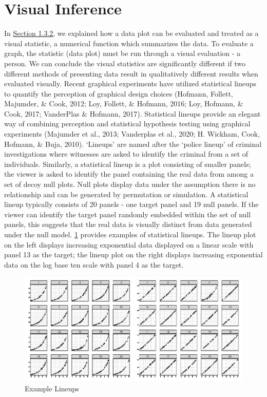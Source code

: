 \documentclass[print]{nuthesis}
\begin{document}
\hypertarget{visual-inference}{%
\section{Visual Inference}\label{visual-inference}}

In \protect\hyperlink{testing-statistical-graphics}{Section 1.3.2}, we explained how a data plot can be evaluated and treated as a visual statistic, a numerical function which summarizes the data.
To evaluate a graph, the statistic (data plot) must be run through a visual evaluation - a person.
We can conclude the visual statistics are significantly different if two different methods of presenting data result in qualitatively different results when evaluated visually.
Recent graphical experiments have utilized statistical lineups to quantify the perception of graphical design choices (Hofmann, Follett, Majumder, \& Cook, 2012; Loy, Follett, \& Hofmann, 2016; Loy, Hofmann, \& Cook, 2017; VanderPlas \& Hofmann, 2017).
Statistical lineups provide an elegant way of combining perception and statistical hypothesis testing using graphical experiments (Majumder et al., 2013; Vanderplas et al., 2020; H. Wickham, Cook, Hofmann, \& Buja, 2010).
`Lineups' are named after the `police lineup' of criminal investigations where witnesses are asked to identify the criminal from a set of individuals.
Similarly, a statistical lineup is a plot consisting of smaller panels; the viewer is asked to identify the panel containing the real data from among a set of decoy null plots.
Null plots display data under the assumption there is no relationship and can be generated by permutation or simulation.
A statistical lineup typically consists of 20 panels - one target panel and 19 null panels.
If the viewer can identify the target panel randomly embedded within the set of null panels, this suggests that the real data is visually distinct from data generated under the null model.
\cref{fig:lineup-example} provides examples of statistical lineups.
The lineup plot on the left displays increasing exponential data displayed on a linear scale with panel 13 as the target; the lineup plot on the right displays increasing exponential data on the log base ten scale with panel 4 as the target.

\begin{figure}[tbp]

{\centering \includegraphics[width=\linewidth,]{thesis_files/figure-latex/lineup-example-1} 

}

\caption{Example Lineups}\label{fig:lineup-example}
\end{figure}
\end{document}
